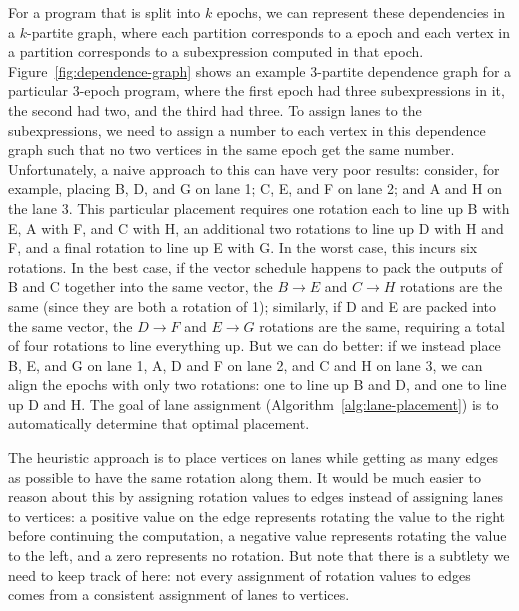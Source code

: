 For a program that is split into $k$ epochs, we can represent these dependencies in a $k$-partite graph, where each partition corresponds to a epoch and each vertex in a partition corresponds to a subexpression computed in that epoch.
Figure~\ref{fig:dependence-graph} shows an example 3-partite dependence graph for a particular 3-epoch program, where the first epoch had three subexpressions in it, the second had two, and the third had three.
To assign lanes to the subexpressions, we need to assign a number to each vertex in this dependence graph such that no two vertices in the same epoch get the same number.
Unfortunately, a naive approach to this can have very poor results: consider, for example, placing B, D, and G on lane 1; C, E, and F on lane 2; and A and H on the lane 3.
This particular placement requires one rotation each to line up B with E, A with F, and C with H, an additional two rotations to line up D with H and F, and a final rotation to line up E with G.
In the worst case, this incurs six rotations.
In the best case, if the vector schedule happens to pack the outputs of B and C together into the same vector, the $B\rightarrow E$ and $C\rightarrow H$ rotations are the same (since they are both a rotation of 1); similarly, if D and E are packed into the same vector, the $D\rightarrow F$ and $E\rightarrow G$ rotations are the same, requiring a total of four rotations to line everything up. 
But we can do better: if we instead place B, E, and G on lane 1, A, D and F on lane 2, and C and H on lane 3, we can align the epochs with only two rotations: one to line up B and D, and one to line up D and H. 
The goal of lane assignment (Algorithm~\ref{alg:lane-placement}) is to automatically determine that optimal placement.

The heuristic approach is to place vertices on lanes while getting as many edges as possible to have the same rotation along them.
It would be much easier to reason about this by assigning rotation values to edges instead of assigning lanes to vertices: a positive value on the edge represents rotating the value to the right before continuing the computation, a negative value represents rotating the value to the left, and a zero represents no rotation.
But note that there is a subtlety we need to keep track of here: not every assignment of rotation values to edges comes from a consistent assignment of lanes to vertices. 

